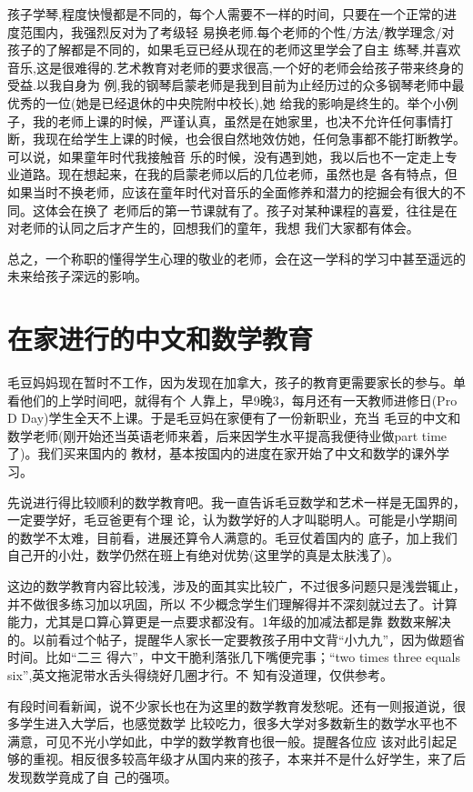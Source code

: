 \documentclass[11pt,a4paper,onecolumn]{article}
\begin{document}
孩子学琴,程度快慢都是不同的，每个人需要不一样的时间，只要在一个正常的进度范围内，我强烈反对为了考级轻
易换老师.每个老师的个性/方法/教学理念/对孩子的了解都是不同的，如果毛豆已经从现在的老师这里学会了自主
练琴,并喜欢音乐,这是很难得的.艺术教育对老师的要求很高,一个好的老师会给孩子带来终身的受益.以我自身为
例,我的钢琴启蒙老师是我到目前为止经历过的众多钢琴老师中最优秀的一位(她是已经退休的中央院附中校长),她
给我的影响是终生的。举个小例子，我的老师上课的时候，严谨认真，虽然是在她家里，也决不允许任何事情打
断，我现在给学生上课的时候，也会很自然地效仿她，任何急事都不能打断教学。可以说，如果童年时代我接触音
乐的时候，没有遇到她，我以后也不一定走上专业道路。现在想起来，在我的启蒙老师以后的几位老师，虽然也是
各有特点，但如果当时不换老师，应该在童年时代对音乐的全面修养和潜力的挖掘会有很大的不同。这体会在换了
老师后的第一节课就有了。孩子对某种课程的喜爱，往往是在对老师的认同之后才产生的，回想我们的童年，我想
我们大家都有体会。


总之，一个称职的懂得学生心理的敬业的老师，会在这一学科的学习中甚至遥远的未来给孩子深远的影响。

\section{在家进行的中文和数学教育}


毛豆妈妈现在暂时不工作，因为发现在加拿大，孩子的教育更需要家长的参与。单看他们的上学时间吧，就得有个
人靠上，早9晚3，每月还有一天教师进修日(Pro D Day)学生全天不上课。于是毛豆妈在家便有了一份新职业，充当
毛豆的中文和数学老师(刚开始还当英语老师来着，后来因学生水平提高我便待业做part time了)。我们买来国内的
教材，基本按国内的进度在家开始了中文和数学的课外学习。


先说进行得比较顺利的数学教育吧。我一直告诉毛豆数学和艺术一样是无国界的，一定要学好，毛豆爸更有个理
论，认为数学好的人才叫聪明人。可能是小学期间的数学不太难，目前看，进展还算令人满意的。毛豆仗着国内的
底子，加上我们自己开的小灶，数学仍然在班上有绝对优势(这里学的真是太肤浅了)。


这边的数学教育内容比较浅，涉及的面其实比较广，不过很多问题只是浅尝辄止，并不做很多练习加以巩固，所以
不少概念学生们理解得并不深刻就过去了。计算能力，尤其是口算心算更是一点要求都没有。1年级的加减法都是靠
数数来解决的。以前看过个帖子，提醒华人家长一定要教孩子用中文背``小九九''，因为做题省时间。比如``二三
得六''，中文干脆利落张几下嘴便完事；``two times three equals six'',英文拖泥带水舌头得绕好几圈才行。不
知有没道理，仅供参考。


有段时间看新闻，说不少家长也在为这里的数学教育发愁呢。还有一则报道说，很多学生进入大学后，也感觉数学
比较吃力，很多大学对多数新生的数学水平也不满意，可见不光小学如此，中学的数学教育也很一般。提醒各位应
该对此引起足够的重视。相反很多较高年级才从国内来的孩子，本来并不是什么好学生，来了后发现数学竟成了自
己的强项。
\end{document}
